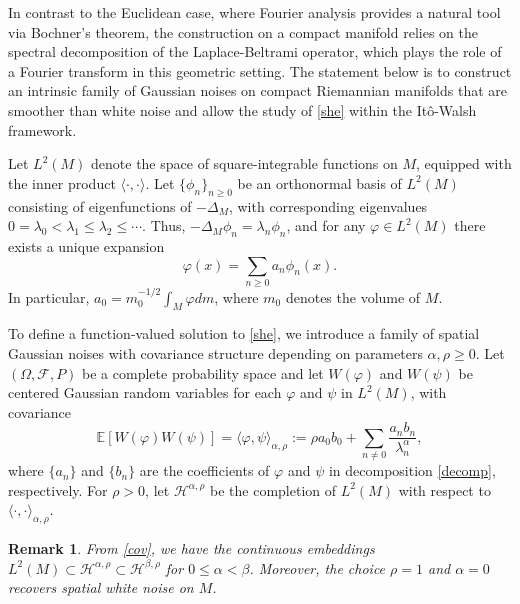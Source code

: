 \documentclass[12pt]{amsart}
\newtheorem{remark}{Remark}[section]
\numberwithin{equation}{section}
\newcommand{\E}{\mathbb{E}}
\newcommand{\1}{\mathbf{1}}
\begin{document}
In contrast to the Euclidean case, where Fourier analysis provides a natural tool via Bochner’s theorem, the construction on a compact manifold relies on the spectral decomposition of the Laplace-Beltrami operator, which plays the role of a Fourier transform in this geometric setting. The statement below is to construct an intrinsic family of Gaussian noises on compact Riemannian manifolds that are smoother than white noise and allow the study of \eqref{she} within the It\^o-Walsh framework. 

Let $L^2(M)$ denote the space of square-integrable functions on $M$, equipped with the inner product $\langle\cdot,\cdot\rangle$. Let $\{\phi_n\}_{n\geq0}$ be an orthonormal basis of $L^2(M)$ consisting of eigenfunctions of $-\Delta_M$, with corresponding eigenvalues $0=\lambda_0<\lambda_1\leq\lambda_2\leq\cdots$. Thus, $-\Delta_M\phi_n=\lambda_n\phi_n$, and for any $\varphi\in L^2(M)$ there exists a unique expansion
\begin{equation}
\label{decomp}
\varphi(x)=\sum_{n\geq 0} a_n\phi_n(x).
\end{equation}
In particular, $a_0=m_0^{-1/2}\int_M\varphi dm$, where $m_0$ denotes the volume of $M$.

To define a function-valued solution to \eqref{she}, we introduce a family of spatial Gaussian noises with covariance structure depending on parameters $\alpha,\rho\geq0$. Let $(\Omega, \mathcal{F}, P)$ be a complete probability space and let $W(\varphi)$ and $W(\psi)$ be centered Gaussian random variables for each $\varphi$ and $\psi$ in $L^2(M)$, with covariance
\begin{equation}
\label{cov}
\E[W(\varphi)W(\psi)] = \langle\varphi, \psi\rangle_{\alpha,\rho}:=\rho a_0b_0 + \sum_{n\neq 0} \frac{a_nb_n}{\lambda_n^\alpha},
\end{equation}
where $\{a_n\}$ and $\{b_n\}$ are the coefficients of $\varphi$ and $\psi$ in decomposition \eqref{decomp}, respectively. For $\rho>0$, let $\mathcal{H}^{\alpha,\rho}$ be the completion of $L^2(M)$ with respect to $\langle\cdot,\cdot\rangle_{\alpha,\rho}$.

\begin{remark}
From \eqref{cov}, we have the continuous embeddings $L^2(M)\subset\mathcal{H}^{\alpha,\rho}\subset\mathcal{H}^{\beta,\rho}$ for $0\leq\alpha<\beta$. Moreover, the choice $\rho=1$ and $\alpha=0$ recovers spatial white noise on $M$.
\end{remark}
\end{document}
